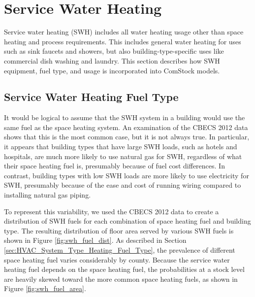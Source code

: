 \section{Service Water Heating}

Service water heating (SWH) includes all water heating usage other than space heating and process requirements. This includes general water heating for uses such as sink faucets and showers, but also building-type-specific uses like commercial dish washing and laundry. This section describes how SWH equipment, fuel type, and usage is incorporated into ComStock models.   

\subsection{Service Water Heating Fuel Type}
\label{sec:SWH_Fuel_Type}

It would be logical to assume that the SWH system in a building would use the same fuel as the space heating system. An examination of the CBECS 2012 data \citep{eia2012cbecs} shows that this is the most common case, but it is not always true. In particular, it appears that building types that have large SWH loads, such as hotels and hospitals, are much more likely to use natural gas for SWH, regardless of what their space heating fuel is, presumably because of fuel cost differences. In contrast, building types with low SWH loads are more likely to use electricity for SWH, presumably because of the ease and cost of running wiring compared to installing natural gas piping.

To represent this variability, we used the CBECS 2012 data to create a distribution of SWH fuels for each combination of space heating fuel and building type. The resulting distribution of floor area served by various SWH fuels is shown in Figure \ref{fig:swh_fuel_dist}. As described in Section \ref{sec:HVAC_System_Type_Heating_Fuel_Type}, the prevalence of different space heating fuel varies considerably by county. Because the service water heating fuel depends on the space heating fuel, the probabilities at a stock level are heavily skewed toward the more common space heating fuels, as shown in Figure \ref{fig:swh_fuel_area}.

